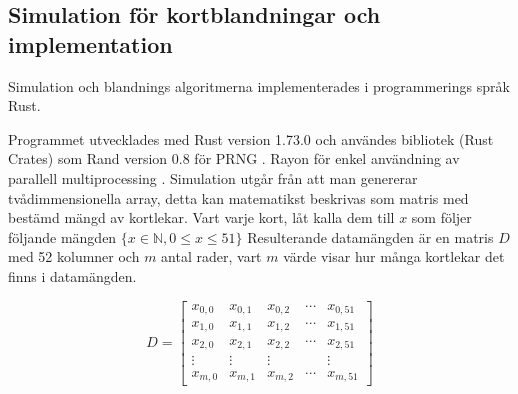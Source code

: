 \documentclass[swedish,a4paper]{article}
\begin{document}



\subsection{Simulation för kortblandningar och implementation}
Simulation och blandnings algoritmerna implementerades i programmerings
språk Rust.

Programmet utvecklades med Rust version 1.73.0 och användes bibliotek
(Rust Crates) som Rand version 0.8 för PRNG \parencite{rand_crate}.
Rayon för enkel användning av  parallell multiprocessing
\parencite{rayon_crate}. Simulation utgår från att man genererar
tvådimmensionella array, detta kan matematikst beskrivas som matris med
bestämd mängd av kortlekar. Vart varje kort, låt kalla dem till $x$ som
följer följande mängden $\{x \in \mathbb{N},  0 \leq x \leq 51 \}$
Resulterande datamängden är en \gls{matris} $D$ med 52 kolumner och $m$ antal
rader, vart $m$ värde visar hur många kortlekar det finns i datamängden.

\begin{equation*}
	D = \begin{bmatrix}
		x_{0,0} & x_{0,1} & x_{0,2} & \cdots & x_{0,51}\\ 
		x_{1,0} & x_{1,1} & x_{1,2} & \cdots & x_{1,51}\\
		x_{2,0} & x_{2,1} & x_{2,2} & \cdots & x_{2,51}\\
		\vdots & \vdots & \vdots & \; & \vdots \\
		x_{m,0} & x_{m,1} & x_{m,2} & \cdots & x_{m,51}
	\end{bmatrix}
\end{equation*}
\end{document}
